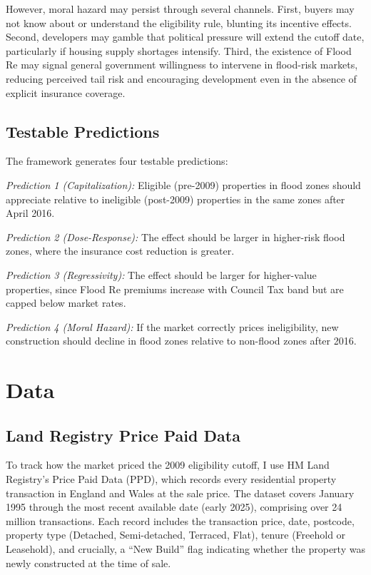\documentclass[12pt]{article}
\begin{document}
However, moral hazard may persist through several channels. First, buyers may not know about or understand the eligibility rule, blunting its incentive effects. Second, developers may gamble that political pressure will extend the cutoff date, particularly if housing supply shortages intensify. Third, the existence of Flood Re may signal general government willingness to intervene in flood-risk markets, reducing perceived tail risk and encouraging development even in the absence of explicit insurance coverage.

\subsection{Testable Predictions}

The framework generates four testable predictions:

\textit{Prediction 1 (Capitalization):} Eligible (pre-2009) properties in flood zones should appreciate relative to ineligible (post-2009) properties in the same zones after April 2016.

\textit{Prediction 2 (Dose-Response):} The effect should be larger in higher-risk flood zones, where the insurance cost reduction is greater.

\textit{Prediction 3 (Regressivity):} The effect should be larger for higher-value properties, since Flood Re premiums increase with Council Tax band but are capped below market rates.

\textit{Prediction 4 (Moral Hazard):} If the market correctly prices ineligibility, new construction should decline in flood zones relative to non-flood zones after 2016.


\section{Data}
\label{sec:data}

\subsection{Land Registry Price Paid Data}

To track how the market priced the 2009 eligibility cutoff, I use HM Land Registry's Price Paid Data (PPD), which records every residential property transaction in England and Wales at the sale price. The dataset covers January 1995 through the most recent available date (early 2025), comprising over 24 million transactions. Each record includes the transaction price, date, postcode, property type (Detached, Semi-detached, Terraced, Flat), tenure (Freehold or Leasehold), and crucially, a ``New Build'' flag indicating whether the property was newly constructed at the time of sale.
\end{document}
